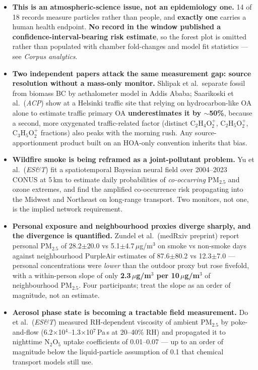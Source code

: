 \documentclass[10pt]{article}
\begin{document}
\footnotesize
\begin{itemize}
\item \textbf{This is an atmospheric-science issue, not an epidemiology one.} 14 of 18
records measure particles rather than people, and \textbf{exactly one} carries a human
health endpoint. \textbf{No record in the window published a confidence-interval-bearing
risk estimate}, so the forest plot is omitted rather than populated with chamber
fold-changes and model fit statistics --- see \textit{Corpus analytics}.

\item \textbf{Two independent papers attack the same measurement gap: source resolution
without a mass-only monitor.} Shlipak et al.\ separate fossil from biomass BC by
aethalometer model in Addis Ababa; Saarikoski et al.\ (\textit{ACP}) show at a Helsinki
traffic site that relying on hydrocarbon-like OA alone to estimate traffic primary OA
\textbf{underestimates it by $\sim$50\%}, because a second, more oxygenated
traffic-related factor (distinct C$_2$H$_4$O$_2^+$, C$_2$H$_5$O$_2^+$, C$_3$H$_5$O$_2^+$
fractions) also peaks with the morning rush. Any source-apportionment product built on
an HOA-only convention inherits that bias.

\item \textbf{Wildfire smoke is being reframed as a joint-pollutant problem.}
Yu et al.\ (\textit{ES\&T}) fit a spatiotemporal Bayesian neural field over 2004--2023
CONUS at 5\,km to estimate daily probabilities of \emph{co-occurring} PM$_{2.5}$ and ozone
extremes, and find the amplified co-occurrence risk propagating into the Midwest and
Northeast on long-range transport. Two monitors, not one, is the implied network
requirement.

\item \textbf{Personal exposure and neighbourhood proxies diverge sharply, and the
divergence is quantified.} Zundel et al.\ (medRxiv preprint) report personal PM$_{2.5}$
of 28.2$\pm$20.0 vs 5.1$\pm$4.7\,$\mu$g/m$^3$ on smoke vs non-smoke days against
neighbourhood PurpleAir estimates of 87.6$\pm$80.2 vs 12.3$\pm$7.0 --- personal
concentrations were \emph{lower} than the outdoor proxy but rose fivefold, with a
within-person slope of only \textbf{2.3\,$\mu$g/m$^3$ per 10\,$\mu$g/m$^3$} of
neighbourhood PM$_{2.5}$. Four participants; treat the slope as an order of magnitude,
not an estimate.

\item \textbf{Aerosol phase state is becoming a tractable field measurement.}
Do et al.\ (\textit{ES\&T}) measured RH-dependent viscosity of ambient PM$_{2.5}$ by
poke-and-flow (6.2$\times$10$^4$--1.3$\times$10$^7$\,Pa\,s at 20--40\% RH) and propagated
it to nighttime N$_2$O$_5$ uptake coefficients of 0.01--0.07 --- up to an order of magnitude
below the liquid-particle assumption of 0.1 that chemical transport models still use.


\end{itemize}
\end{document}
